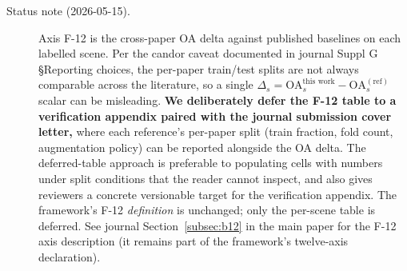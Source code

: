 \documentclass[11pt,a4paper]{article}
\begin{document}
\begin{description}
\item[Status note (2026-05-15).] Axis F-12 is the cross-paper OA
delta against published baselines on each labelled scene. Per the
candor caveat documented in journal Suppl G §Reporting choices,
the per-paper train/test splits are not always comparable across
the literature, so a single $\Delta_s = \mathrm{OA}^{\text{this work}}_s
- \mathrm{OA}^{(\text{ref})}_s$ scalar can be misleading.
\textbf{We deliberately defer the F-12 table to a verification
appendix paired with the journal submission cover letter,} where
each reference's per-paper split (train fraction, fold count,
augmentation policy) can be reported alongside the OA delta.
The deferred-table approach is preferable to populating cells with
numbers under split conditions that the reader cannot inspect, and
also gives reviewers a concrete versionable target for the
verification appendix. The framework's F-12 \emph{definition} is
unchanged; only the per-scene table is deferred. See journal
Section~\ref{subsec:b12} in the main paper for the F-12 axis
description (it remains part of the framework's twelve-axis
declaration).
\end{description}



\end{document}
